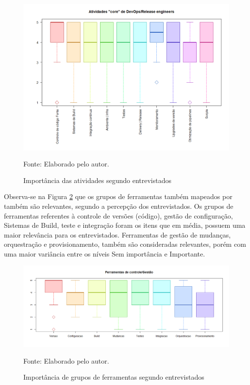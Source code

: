 \documentclass[twoside,english,brazilian]{UNISINOSartigo}
\newcommand{\source}[1]{\caption*{Fonte: {#1}} }
\begin{document}
\begin{figure}[h]
    \centering
    \caption{Importância das atividades segundo entrevistados}
       \includegraphics[scale=.5]{imagens/Rplot.png}
        \source{Elaborado pelo autor.}
    \label{fig:importanciapratDevOps}
\end{figure}
Observa-se na Figura \ref{fig:importFerramentas} que os grupos de ferramentas também mapeados por  também são relevantes, segundo a percepção dos entrevistados. Os grupos de ferramentas referentes à controle de versões (código), gestão de configuração, Sistemas de Build, teste e integração foram os itens que em média, possuem uma maior relevância para os entrevistados. Ferramentas de gestão de mudanças, orquestração e provisionamento, também são consideradas relevantes, porém com uma maior variância entre os níveis Sem importância e Importante.
\begin{figure}[h]
    \centering
    \caption{Importância de grupos de ferramentas segundo entrevistados}
       \includegraphics[scale=.5]{imagens/Rplot05.png}
        \source{Elaborado pelo autor.}
    \label{fig:importFerramentas}
\end{figure}
\end{document}
